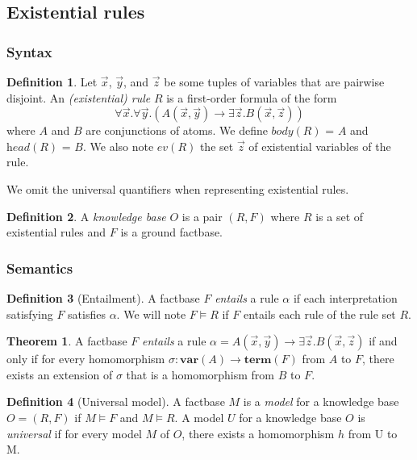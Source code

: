 \documentclass{article}
\theoremstyle{definition}
\newtheorem{definition}{Definition}[section]
\newtheorem{theorem}{Theorem}[section]
\theoremstyle{remark}
\begin{document}
\subsection{Existential rules}

\subsubsection{Syntax}

\begin{definition}
Let $\vec x$, $\vec y$, and $\vec z$ be some tuples of variables that are pairwise disjoint. An \emph{(existential) rule} $R$ is a first-order formula	of the form $$\forall \vec x.\forall \vec y.( A(\vec x,\vec y) \rightarrow \exists \vec z. B(\vec x,\vec z))$$ where $A$ and $B$ are conjunctions of atoms. We define \emph{$\textit{body}(R)$} = $A$ and \emph{$\textit{head}(R)$} = $B$. We also note \emph{$\textit{ev}(R)$} the set $\vec{z}$ of existential variables of the rule.
\end{definition}
We omit the universal quantifiers when representing existential rules.
\begin{definition}

A \emph{knowledge base} $O$ is a pair $(R,F)$ where $R$ is a set of existential rules and $F$ is a  ground factbase.
\end{definition}


\subsubsection{Semantics}

\begin{definition}[Entailment]
A factbase $F$ \emph{entails} a rule $\alpha$ if each interpretation satisfying $F$ satisfies $\alpha$. We will note $F \models R$ if $F$ entails each rule of the rule set $R$.
\end{definition}

\begin{theorem}
A factbase $F$ \emph{entails} a rule $\alpha = A(\vec x,\vec y) \rightarrow \exists \vec z. B(\vec x,\vec z)$ if and only if for every homomorphism $\sigma: \textbf{var}(A) \to \textbf{term}(F)$ from $A$ to $F$, there exists an extension of $\sigma$ that is a homomorphism from $B$ to $F$.
\end{theorem}



\begin{definition}[Universal model]
A factbase $M$ is a \emph{model} for a knowledge base $O = (R,F)$ if $M \models F$ and $M \models R$.  A model $U$ for a knowledge base $O$ is \emph{universal} if for
every model $M$ of $O$, there exists a homomorphism $h$ from U to M.
\end{definition}
\end{document}
